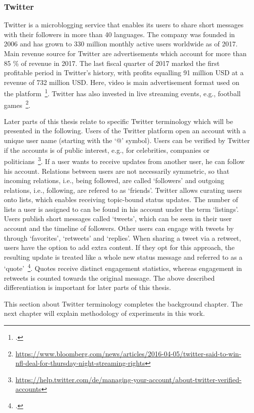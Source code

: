 \subsubsection{Twitter}
\label{sub:sn_twitter}

Twitter is a microblogging service that enables its users to share short
messages with their followers in more than 40 languages.
The company was founded in 2006 and has grown to 330 million monthly active
users worldwide as of 2017.
Main revenue source for Twitter are advertisements which account for more than
85 \% of revenue in 2017.
The last fiscal quarter of 2017 marked the first profitable period in Twitter's
history, with profits equalling 91 million USD at a revenue of 732 million USD.
Here, video is main advertisement format used on the platform~\footcite{Twitter2018}.
Twitter has also invested in live streaming events, e.g., football games~\footnote{\url{https://www.bloomberg.com/news/articles/2016-04-05/twitter-said-to-win-nfl-deal-for-thursday-night-streaming-rights}}.

Later parts of this thesis relate to specific Twitter terminology which will be 
presented in the following.
Users of the Twitter platform open an account with a unique user name (starting
with the `@' symbol).
Users can be verified by Twitter if the accounts is of public interest, e.g.,
for celebrities, companies or politicians~\footnote{\url{https://help.twitter.com/de/managing-your-account/about-twitter-verified-accounts}}.
If a user wants to receive updates from another user, he can follow his
account.
Relations between users are not necessarily symmetric, so that incoming relations,
i.e., being followed, are called `followers' and outgoing relations, i.e.,
following, are refered to as `friends'.
Twitter allows curating users onto lists, which enables receiving topic-bound
status updates.
The number of lists a user is assigned to can be found in his account under the
term `listings'.
Users publish short messages called `tweets', which can be seen in their user
account and the timeline of followers.
Other users can engage with tweets by through `favorites', `retweets' and `replies'.
When sharing a tweet via a retweet, users have the option to add extra content.
If they opt for this approach, the resulting update is treated like a whole new
status message and referred to as a `quote'~\footcite{Kwak2010}.
Quotes receive distinct engagement statistics, whereas engagement in retweets
is counted towards the original message.
The above described differentiation is important for later parts of this thesis.

This section about Twitter terminology completes the background chapter.
The next chapter will explain methodology of experiments in this work.
